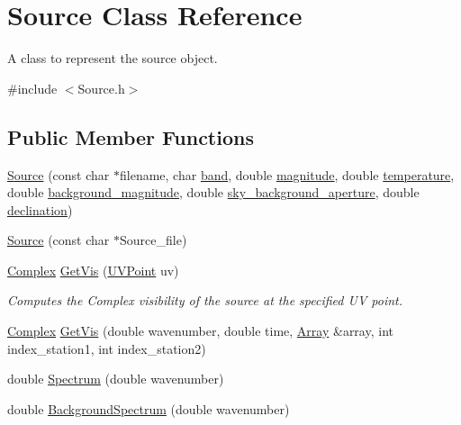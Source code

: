 \hypertarget{classSource}{
\section{Source Class Reference}
\label{classSource}
}


A class to represent the source object.  




{\ttfamily \#include $<$Source.h$>$}

\subsection*{Public Member Functions}
\begin{DoxyCompactItemize}
\item 
\hyperlink{classSource_aba8cb9f6fa274c8079bd5715850bf967}{Source} (const char $\ast$filename, char \hyperlink{classSource_a380447fc2b80c1b6bc5c2a8b31ed6b98}{band}, double \hyperlink{classSource_a6a63845ae2495f7d0b9758e969ae34a5}{magnitude}, double \hyperlink{classSource_a01ad608788eb4c0e4a7b2a6228398394}{temperature}, double \hyperlink{classSource_af8077dd4bf90295d11680d6dbd0baea9}{background\_\-magnitude}, double \hyperlink{classSource_aa21a6313f7ab7c41bb206ed05f0909cc}{sky\_\-background\_\-aperture}, double \hyperlink{classSource_acd65dbd79034b6bd27ce7bea9cddf80b}{declination})
\item 
\hyperlink{classSource_a7a7af8ba36f94e74bf2d780f6636cfe4}{Source} (const char $\ast$Source\_\-file)
\item 
\hyperlink{Matrix_8h_a37333e1628babc1863d6963489e5e9ea}{Complex} \hyperlink{classSource_ad87c09b8cc1ee838435de12a93495e1e}{GetVis} (\hyperlink{classUVPoint}{UVPoint} uv)
\begin{DoxyCompactList}\small\item\em Computes the Complex visibility of the source at the specified UV point. \item\end{DoxyCompactList}\item 
\hyperlink{Matrix_8h_a37333e1628babc1863d6963489e5e9ea}{Complex} \hyperlink{classSource_ad802ea02880525552b1feea0bde38244}{GetVis} (double wavenumber, double time, \hyperlink{classArray}{Array} \&array, int index\_\-station1, int index\_\-station2)
\item 
double \hyperlink{classSource_a1b9f408aa6c5dcd5550e9cb28922e3af}{Spectrum} (double wavenumber)
\item 
double \hyperlink{classSource_a29c1541293674ddb2b9e7aa4cb130306}{BackgroundSpectrum} (double wavenumber)
\end{DoxyCompactItemize}
